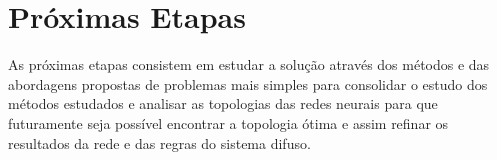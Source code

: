 \section{Próximas Etapas}

As próximas etapas consistem em estudar a solução através dos métodos e das abordagens 
propostas de problemas mais simples para consolidar o estudo dos métodos estudados e 
analisar as topologias das redes neurais para que futuramente seja possível encontrar 
a topologia ótima e assim refinar os resultados da rede e das regras do sistema difuso.

